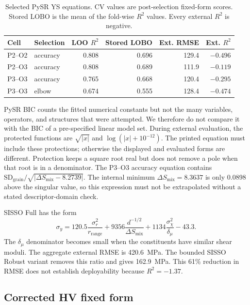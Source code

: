 \documentclass[a4paper,11pt]{article}
\begin{document}
\begin{table}[H]
\centering
\caption{Selected PySR YS equations. CV values are post-selection fixed-form scores. Stored LOBO is the mean of the fold-wise $R^2$ values. Every external $R^2$ is negative.}
\label{tab:pysr}
\small
\begin{tabular}{llrrrr}
\toprule
Cell & Selection & LOO $R^2$ & Stored LOBO & Ext. RMSE & Ext. $R^2$ \\
\midrule
P2--O2 & accuracy & 0.808 & 0.696 & 129.4 & $-0.496$ \\
P2--O3 & accuracy & 0.808 & 0.689 & 111.9 & $-0.119$ \\
P3--O3 & accuracy & 0.765 & 0.668 & 120.4 & $-0.295$ \\
P3--O3 & elbow & 0.674 & 0.555 & 128.4 & $-0.474$ \\
\bottomrule
\end{tabular}
\end{table}

PySR BIC counts the fitted numerical constants but not the many variables, operators, and structures that were attempted. We therefore do not compare it with the BIC of a pre-specified linear model set. During external evaluation, the protected functions are $\sqrt{|x|}$ and $\log(|x|+10^{-12})$. The printed equation must include these protections; otherwise the displayed and evaluated forms are different. Protection keeps a square root real but does not remove a pole when that root is in a denominator. The P3--O3 accuracy equation contains $\mathrm{SD}_{\mathrm{grain}}/\sqrt{|\Delta S_{\mathrm{mix}}-8.2739|}$. The internal minimum $\Delta S_{\mathrm{mix}}=8.3637$ is only 0.0898 above the singular value, so this expression must not be extrapolated without a stated descriptor-domain check.

SISSO Full has the form
\begin{equation}
\sigma_y=120.5\frac{\sigma_r^2}{r_{\mathrm{range}}}
+9356\frac{d^{-1/2}}{\Delta S_{\mathrm{mix}}}
+1134\frac{\sigma_\chi^2}{\delta_\mu}-43.3.
\end{equation}
The $\delta_\mu$ denominator becomes small when the constituents have similar shear moduli. The aggregate external RMSE is \SI{420.6}{MPa}. The bounded SISSO Robust variant removes this ratio and gives \SI{162.9}{MPa}. This 61\% reduction in RMSE does not establish deployability because $R^2=-1.37$.

\subsection{Corrected HV fixed form}
\end{document}

